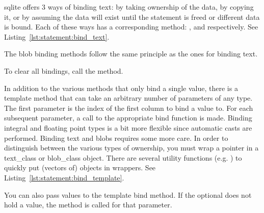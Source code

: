 \Gls{sqlite} offers 3 ways of binding text: by taking ownership of the data, by copying it, or by assuming the data will exist until the statement is freed or different data is bound. Each of these ways has a corresponding method: ,  and  respectively. See Listing~\ref{lst:statement:bind_text}.



The blob binding methods follow the same principle as the ones for binding text.

To clear all bindings, call the  method.

In addition to the various methods that only bind a single value, there is a template  method that can take an arbitrary number of parameters of any type. The first parameter is the index of the first column to bind a value to. For each subsequent parameter, a call to the appropriate bind function is made. Binding integral and floating point types is a bit more flexible since automatic casts are performed. Binding text and blobs requires some more care. In order to distinguish between the various types of ownership, you must wrap a pointer in a \gls{text_class} or \gls{blob_class} object. There are several utility functions (e.g. ) to quickly put (vectors of) objects in wrappers. See Listing~\ref{lst:statement:bind_template}.



You can also pass  values to the template bind method. If the optional does not hold a value, the  method is called for that parameter.

